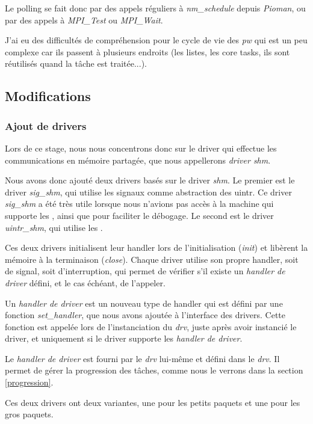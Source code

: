 Le polling se fait donc par des appels réguliers à \emph{nm_schedule} depuis \emph{Pioman}, ou par des appels à \emph{MPI_Test} ou \emph{MPI_Wait}.

J'ai eu des difficultés de compréhension pour le cycle de vie des \emph{pw} qui est un peu complexe car
ils passent à plusieurs endroits (les listes, les core tasks, ils sont réutilisés quand la tâche est traitée...).

\subsection{Modifications}

\subsubsection{Ajout de drivers}

Lors de ce stage, nous nous concentrons donc sur le driver qui effectue les communications en mémoire partagée,
que nous appellerons \emph{driver shm}.

Nous avons donc ajouté deux drivers basés sur le driver \emph{shm}.
Le premier est le driver \emph{sig_shm}, qui utilise les signaux comme abstraction des uintr.
Ce driver \emph{sig_shm} a été très utile lorsque nous n'avions pas accès à la machine qui supporte les \uintr{},
ainsi que pour faciliter le débogage.
Le second est le driver \emph{uintr_shm}, qui utilise les \uintr{}.

Ces deux drivers initialisent leur handler lors de l'initialisation (\emph{init}) et libèrent la mémoire à la terminaison (\emph{close}).
Chaque driver utilise son propre handler, soit de signal, soit d'interruption, qui permet de vérifier s'il existe un \emph{handler de driver} défini,
et le cas échéant, de l'appeler.

Un \emph{handler de driver} est un nouveau type de handler qui est défini par une fonction \emph{set_handler},
que nous avons ajoutée à l'interface des drivers.
Cette fonction est appelée lors de l'instanciation du \emph{drv},
juste après avoir instancié le driver, et uniquement si le driver supporte les \emph{handler de driver}.

Le \emph{handler de driver} est fourni par le \emph{drv} lui-même et défini dans le \emph{drv}.
Il permet de gérer la progression des tâches, comme nous le verrons dans la section \ref{progression}.

Ces deux drivers ont deux variantes, une pour les petits paquets et une pour les gros paquets.

